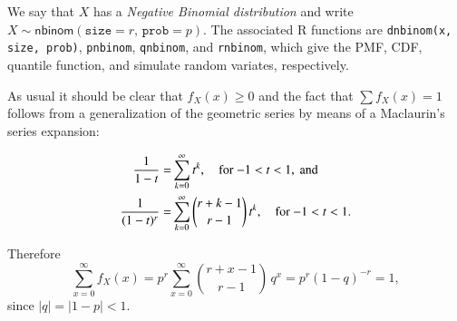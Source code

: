 \documentclass[captions=tableheading]{scrbook}
\begin{document}
We say that \(X\) has a \emph{Negative Binomial distribution} and write \(X\sim\mathsf{nbinom}(\mathtt{size}=r,\,\mathtt{prob}=p)\). The associated \textsf{R} functions are \texttt{dnbinom(x, size, prob)}, \texttt{pnbinom}, \texttt{qnbinom}, and \texttt{rnbinom}, which give the PMF, CDF, quantile function, and simulate random variates, respectively.

As usual it should be clear that \(f_{X}(x)\geq 0\) and the fact that \(\sum f_{X}(x)=1\) follows from a generalization of the geometric series by means of a Maclaurin's series expansion:

\begin{alignat}{1}
\frac{1}{1-t}= & \sum_{k=0}^{\infty}t^{k},\quad\mbox{for \ensuremath{-1<t<1}},\mbox{ and}\\
\frac{1}{(1-t)^{r}}= & \sum_{k=0}^{\infty}{r+k-1 \choose r-1}\, t^{k},\quad\mbox{for \ensuremath{-1<t<1}}.
\end{alignat}

Therefore
\begin{equation}
\sum_{x=0}^{\infty}f_{X}(x)=p^{r}\sum_{x=0}^{\infty}{r+x-1 \choose r-1}\, q^{x}=p^{r}(1-q)^{-r}=1,
\end{equation}
since \(|q|=|1-p|<1\). 
\end{document}
